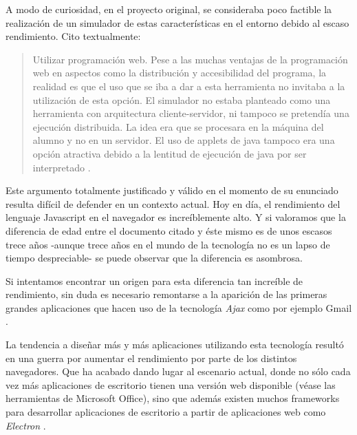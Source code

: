 A modo de curiosidad, en el proyecto original, se consideraba poco factible la realización de 
un simulador de estas características en el entorno debido al escaso rendimiento. Cito textualmente:

\begin{quotation}
Utilizar programación web. Pese a las muchas ventajas de la programación
web en aspectos como la distribución y accesibilidad del programa, la realidad
es que el uso que se iba a dar a esta herramienta no invitaba a la utilización de
esta opción. El simulador no estaba planteado como una herramienta con
arquitectura cliente-servidor, ni tampoco se pretendía una ejecución distribuida.
La idea era que se procesara en la máquina del alumno y no en un servidor. El
uso de applets de java tampoco era una opción atractiva debido a la lentitud de
ejecución de java por ser interpretado \cite{SIMDE}.
\end{quotation}

\bigskip
Este argumento totalmente justificado y válido en el momento de su enunciado
resulta difícil de defender en un contexto actual. Hoy en día, el rendimiento del lenguaje 
Javascript en el navegador es increíblemente alto. Y si valoramos que 
la diferencia de edad entre el documento citado y éste mismo es de unos escasos trece años -aunque 
trece años en el mundo de la tecnología no es un lapso de tiempo despreciable- se puede observar
que la diferencia es asombrosa.
 
\bigskip
Si intentamos encontrar un origen para esta diferencia tan increíble de rendimiento, sin duda
es necesario remontarse a la aparición de las primeras grandes aplicaciones que hacen uso de la tecnología
\textit{Ajax} como por ejemplo Gmail \cite{EvolutionJavascript}.

\bigskip
La tendencia a diseñar más y más aplicaciones utilizando esta tecnología resultó en una guerra por aumentar el rendimiento por parte de los distintos navegadores. 
Que ha acabado dando lugar al escenario actual, donde no sólo cada vez más aplicaciones de escritorio tienen una versión web 
disponible (véase las herramientas de Microsoft Office), sino que además existen muchos frameworks para 
desarrollar aplicaciones de escritorio a partir de aplicaciones web como \textit{Electron} \cite{Electron}.
